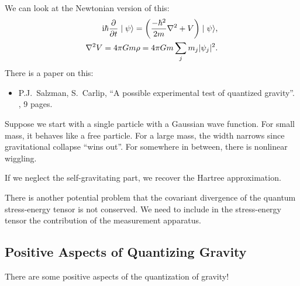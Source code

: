 We can look at the Newtonian version of this:
\begin{equation}
\begin{split}
  \mathrm{i}\hbar\frac{\partial}{\partial t}\mid\psi\rangle
  = \left(\frac{-\hbar^{2}}{2m}\nabla^{2} + V\right)\mid\psi\rangle,\\
  \nabla^{2}V = 4\pi Gm\rho = 4\pi Gm\sum_{j}m_{j}|\psi_{j}|^{2}.
\end{split}
\end{equation}
There is a paper on this:
\begin{itemize}
\item P.J.~Salzman, S.~Carlip, ``A possible experimental test of
  quantized gravity''. , 9 pages.
\end{itemize}
Suppose we start with a single particle with a Gaussian wave
function. For small mass, it behaves like a free particle. For a large
mass, the width narrows since gravitational collapse ``wins out''. For
somewhere in between, there is nonlinear wiggling.

If we neglect the self-gravitating part, we recover the Hartree
approximation.

There is another potential problem that the covariant divergence of the
quantum stress-energy tensor is not conserved. We need to include in the
stress-energy tensor the contribution of the measurement apparatus.

\subsection{Positive Aspects of Quantizing Gravity}

There are some positive aspects of the quantization of gravity!

